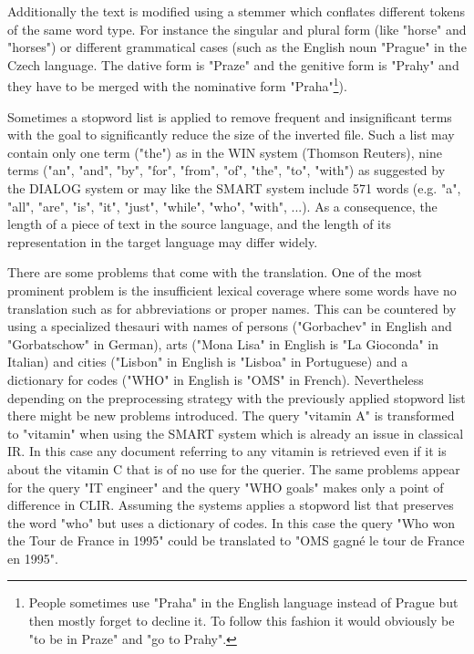\documentclass[journal]{IEEEtran}
\begin{document}
Additionally the text is modified using a stemmer which conflates different tokens of the same word type.
For instance the singular and plural form (like "horse" and "horses") or different grammatical cases (such as the English noun "Prague" in the Czech language. The dative form is "Praze" and the genitive form is "Prahy" and they have to be merged with the nominative form "Praha"\footnote{People sometimes use "Praha" in the English language instead of Prague but then mostly forget to decline it.
To follow this fashion it would obviously be "to be in Praze" and "go to Prahy".}).

Sometimes a stopword list is applied to remove frequent and insignificant terms with the goal to significantly reduce the size of the inverted file.
Such a list may contain only one term ("the") as in the WIN system (Thomson Reuters), nine terms ("an", "and", "by", "for", "from", "of", "the", "to", "with") as suggested by the DIALOG system or may like the SMART system include 571 words (e.g. "a", "all", "are", "is", "it", "just", "while", "who", "with", ...).
As a consequence, the length of a piece of text in the source language, and the length of its representation in the target language may differ widely.

There are some problems that come with the translation.
One of the most prominent problem is the insufficient lexical coverage where some words have no translation such as for abbreviations or proper names.
This can be countered by using a specialized thesauri with names of persons ("Gorbachev" in English and "Gorbatschow" in German), arts ("Mona Lisa" in English is "La Gioconda" in Italian) and cities ("Lisbon" in English is "Lisboa" in Portuguese) and a dictionary for codes ("WHO" in English is "OMS" in French).
Nevertheless depending on the preprocessing strategy with the previously applied stopword list there might be new problems introduced.
The query "vitamin A" is transformed to "vitamin" when using the SMART system which is already an issue in classical IR.
In this case any document referring to any vitamin is retrieved even if it is about the vitamin C that is of no use for the querier.
The same problems appear for the query "IT engineer" and the query "WHO goals" makes only a point of difference in CLIR.
Assuming the systems applies a stopword list that preserves the word "who" but uses a dictionary of codes.
In this case the query "Who won the Tour de France in 1995" could be translated to "OMS gagn\'{e} le tour de France en 1995".
\end{document}
